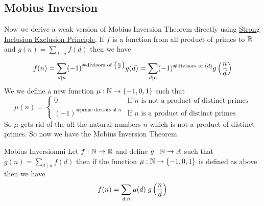 \subsection{Mobius Inversion}
Now we derive a weak version of Mobius Inversion Theorem directly using \hyperref[th:sie]{Strong Inclusion Exclusion Principle}. If $f$ is a function from all product of primes to $\mathbb{R}$ and $g(n)=\sum\limits_{d\mid n}f(d)$ then we have $$f(n)=\sum\limits_{d\mid n}(-1)^{\#\text{divisors of $\left(\frac{n}d\right)$}}g(d)=\sum_{d\mid n}(-1)^{\#\text{divisors of $(d)$}}g\left(\frac{n}d\right)$$We we define a new function $\mu:\mathbb{N}\to \{-1,0,1\}$  such that $$\mu(n)=\begin{cases}
	0 & \text{If $n$ is not a product of distinct primes}\\
	(-1)^{\#\text{prime divisors of $n$}} & \text{If $n$ is a product of distinct primes}
\end{cases}$$So $\mu$ gets rid of the all the natural numbers $n$ which is not a product of distinct primes. 
So now we have the Mobius Inversion Theorem
\begin{Theorem}{Mobius Inversion}{mi}
	Let $f:\mathbb{N}\to \mathbb{R}$ and define $g:\mathbb{N}\to \mathbb{R}$ such that $g(n)=\sum\limits_{d\mid n}f(d)$ then if the  function $\mu:\mathbb{N}\to \{-1,0,1\}$   is defined as above then we have $$f(n)=\sum_{d\mid n}\mu(d)\; g\left(\frac{n}d\right)$$
\end{Theorem}
